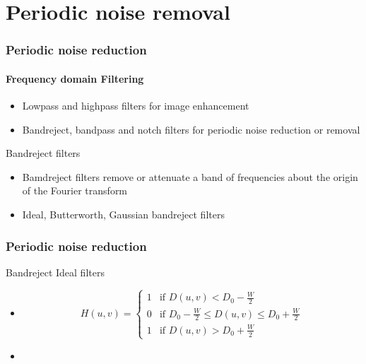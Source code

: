 \documentclass{beamer}
\begin{document}
\section{Periodic noise removal}
\begin{frame}
\frametitle{Periodic noise reduction}
\framesubtitle{Frequency domain Filtering}
\begin{itemize}
\item Lowpass and highpass filters for image enhancement
\item Bandreject, bandpass and notch filters for periodic noise reduction or removal
\end{itemize}
\begin{block}{Bandreject filters}
\begin{itemize}
\item Bamdreject filters remove or attenuate a band of frequencies about the origin of the Fourier transform
\item Ideal, Butterworth, Gaussian bandreject filters
\end{itemize}
\end{block}
\end{frame}
\begin{frame}
\frametitle{Periodic noise reduction}
\begin{block}{Bandreject Ideal filters}
\begin{itemize}
\item[] 
	\[
 	H(u,v) = 
  	\begin{cases} 
   	1 & \text{if } D(u,v) < D_{0}-\frac{W}{2} \\
   	0 & \text{if } D_{0}-\frac{W}{2} \leq  D(u,v) \leq D_{0}+\frac{W}{2} \\
   	1 & \text{if } D(u,v) > D_{0}+\frac{W}{2}
  	\end{cases}
	\]
\item[] 
\end{itemize}
\end{block}
\end{frame}
\end{document}
